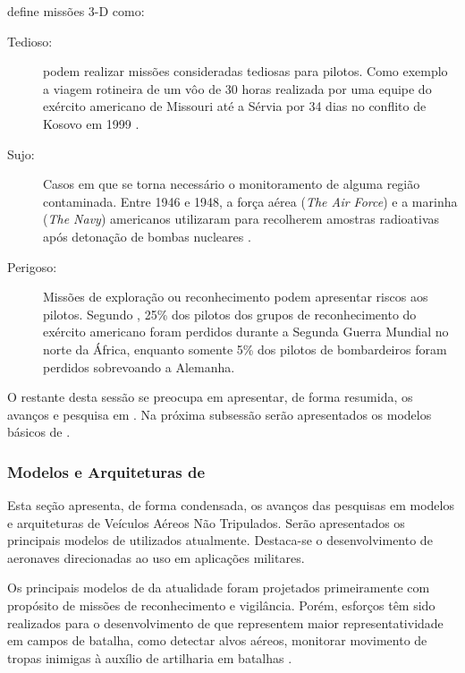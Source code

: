 \cite{uav_roadmap2005} define missões 3-D como:
\begin{description}
\item[Tedioso: ]
\vants podem realizar missões consideradas tediosas para pilotos. Como exemplo a viagem rotineira de um vôo de 30 horas realizada por uma equipe do exército americano de Missouri até a Sérvia por 34 dias no conflito de Kosovo em 1999 \cite{uav_roadmap2005}. 

\item[Sujo: ]
Casos em que se torna necessário o monitoramento de alguma região contaminada. Entre 1946 e 1948, a força aérea (\emph{The Air Force}) e a marinha (\emph{The Navy}) americanos utilizaram \vants para recolherem amostras radioativas após detonação de bombas nucleares \cite{uav_roadmap2005}.

\item[Perigoso: ]
Missões de exploração ou reconhecimento podem apresentar riscos aos pilotos. Segundo \cite{uav_roadmap2005}, 25\%  dos pilotos dos grupos de reconhecimento do exército americano foram perdidos durante a Segunda Guerra Mundial no norte da África, enquanto somente 5\% dos pilotos de bombardeiros foram perdidos sobrevoando a Alemanha.

\end{description}

O restante desta sessão se preocupa em apresentar, de forma resumida, os avanços e pesquisa em \uavs. Na próxima subsessão serão apresentados os modelos básicos de \vants.

\subsubsection{Modelos e Arquiteturas de \vants}

Esta seção apresenta, de forma condensada, os avanços das pesquisas em modelos e arquiteturas de Veículos Aéreos Não Tripulados. Serão apresentados os principais modelos de \vants utilizados atualmente. Destaca-se o desenvolvimento de aeronaves direcionadas ao uso em aplicações militares.

Os principais modelos de \vants da atualidade foram projetados primeiramente com propósito de missões de reconhecimento e vigilância. Porém, esforços têm sido realizados para o desenvolvimento de \vants que representem maior representatividade em campos de batalha, como detectar alvos aéreos, monitorar movimento de tropas inimigas à auxílio de artilharia em batalhas \cite{Bone2003}.

